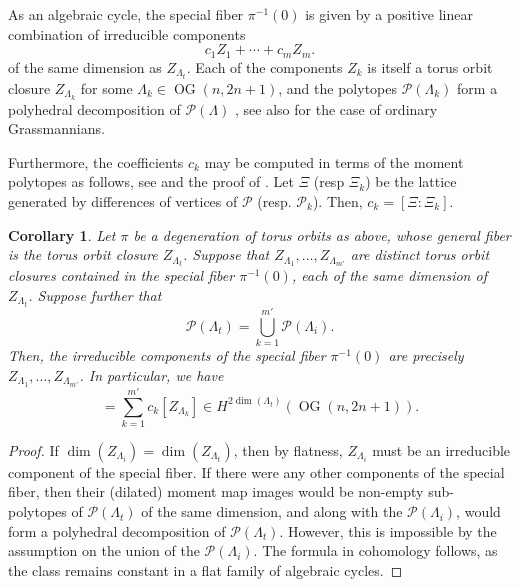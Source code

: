 \documentclass[12pt]{amsart}
\newtheorem{corollary}[definition]{Corollary}
\DeclareMathOperator{\OG}{OG}
\newcommand{\cP}{\mathcal{P}}
\begin{document}
As an algebraic cycle, the special fiber $\pi^{-1}(0)$ is given by a positive linear combination of irreducible components
\begin{equation*}
    c_1Z_{1}+\cdots+c_mZ_{m}.
\end{equation*}
of the same dimension as $Z_{\Lambda_t}$. Each of the components $Z_k$ is itself a torus orbit closure $Z_{\Lambda_k}$ for some $\Lambda_k\in\OG(n,2n+1)$, and the polytopes $\cP(\Lambda_k)$ form a polyhedral decomposition of $\cP(\Lambda)$ \cite[Proposition 3.6]{ksz}, see also \cite[Proposition 1.2.11]{kapranov} for the case of ordinary Grassmannians. 

Furthermore, the coefficients $c_k$ may be computed in terms of the moment polytopes as follows, see \cite[(1.3)]{ksz} and the proof of \cite[Proposition 1.2.15]{kapranov}. Let $\Xi$ (resp $\Xi_k$) be the lattice generated by differences of vertices of $\cP$ (resp. $\cP_k$). Then, $c_k=[\Xi:\Xi_k]$.

\begin{corollary}\label{cor:moment_map_union}
    Let $\pi$ be a degeneration of torus orbits as above, whose general fiber is the torus orbit closure $Z_{\Lambda_t}$. Suppose that $Z_{\Lambda_1},\ldots,Z_{\Lambda_{m'}}$ are distinct torus orbit closures contained in the special fiber $\pi^{-1}(0)$, each of the same dimension of $Z_{\Lambda_t}$. Suppose further that
    \begin{equation*}
        \cP(\Lambda_t)=\bigcup_{k=1}^{m'}\cP(\Lambda_{i}).
    \end{equation*}
    Then, the irreducible components of the special fiber $\pi^{-1}(0)$ are precisely $Z_{\Lambda_1},\ldots,Z_{\Lambda_{m'}}$. In particular, we have
    \begin{equation*}
        [Z_{\Lambda_t}]=\sum_{k=1}^{m'}c_k[Z_{\Lambda_k}]\in H^{2\dim(\Lambda_t)}(\OG(n,2n+1)).
    \end{equation*}
\end{corollary}

\begin{proof}
    If $\dim(Z_{\Lambda_i})=\dim(Z_{\Lambda_t})$, then by flatness, $Z_{\Lambda_i}$ must be an irreducible component of the special fiber. If there were any other components of the special fiber, then their (dilated) moment map images would be non-empty sub-polytopes of $\cP(\Lambda_t)$ of the same dimension, and along with the $\cP(\Lambda_{i})$, would form a polyhedral decomposition of $\cP(\Lambda_t)$. However, this is impossible by the assumption on the union of the $\cP(\Lambda_i)$. The formula in cohomology follows, as the class remains constant in a flat family of algebraic cycles.
\end{proof}
\end{document}
